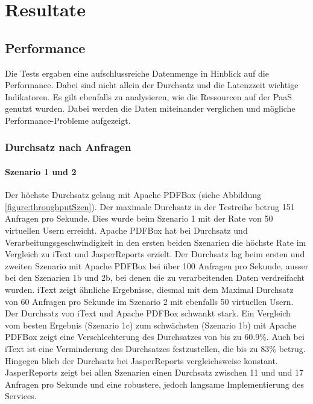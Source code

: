\documentclass[main.tex]{subfiles}
\begin{document}
\chapter{Resultate} 

\section{Performance}
Die Tests ergaben eine aufschlussreiche Datenmenge in Hinblick auf die Performance. Dabei sind nicht allein der Durchsatz und die Latenzzeit wichtige Indikatoren. Es gilt ebenfalls zu analysieren, wie die Ressourcen auf der PaaS genutzt wurden. Dabei werden die Daten miteinander verglichen und mögliche Performance-Probleme aufgezeigt. 



\subsection{Durchsatz nach Anfragen}

\subsubsection{Szenario 1 und 2}
Der höchste Durchsatz gelang mit Apache PDFBox (siehe Abbildung \ref{figure:throughputSzen}). Der maximale Durchsatz in der Testreihe betrug 151 Anfragen pro Sekunde. Dies wurde beim Szenario 1 mit der Rate von 50 virtuellen Usern erreicht.  Apache PDFBox hat bei Durchsatz und Verarbeitungsgeschwindigkeit in den ersten beiden Szenarien die höchste Rate im Vergleich zu iText und JasperReports erzielt. 
Der Durchsatz lag beim ersten und zweiten Szenario mit Apache PDFBox bei über 100 Anfragen pro Sekunde, ausser bei den Szenarien 1b und 2b, bei denen die zu verarbeitenden Daten verdreifacht wurden. 
iText zeigt ähnliche Ergebnisse, diesmal mit dem Maximal Durchsatz von 60 Anfragen pro Sekunde im Szenario 2 mit ebenfalls 50 virtuellen Usern. Der Durchsatz von iText und Apache PDFBox schwankt stark. Ein Vergleich vom besten Ergebnis (Szenario 1c) zum schwächsten (Szenario 1b) mit Apache PDFBox zeigt eine Verschlechterung des Durchsatzes von bis zu 60.9\%. Auch bei iText ist eine Verminderung des Durchsatzes festzustellen, die  bis zu 83\% betrug. Hingegen blieb der Durchsatz bei JasperReports vergleichsweise konstant. JasperReports zeigt bei allen Szenarien einen Durchsatz zwischen 11 und und 17 Anfragen pro Sekunde und eine robustere, jedoch langsame Implementierung des Services.
\end{document}
